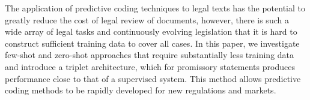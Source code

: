 The application of predictive coding techniques to legal texts has the potential to greatly reduce the cost of legal review of documents, however, there is such a wide array of legal tasks and continuously evolving legislation that it is hard to construct sufficient training data to cover all cases. In this paper, we investigate few-shot and zero-shot approaches that require substantially less training data and introduce a triplet architecture, which for promissory statements produces performance close to that of a supervised system. This method allows predictive coding methods to be rapidly developed for new regulations and markets.
